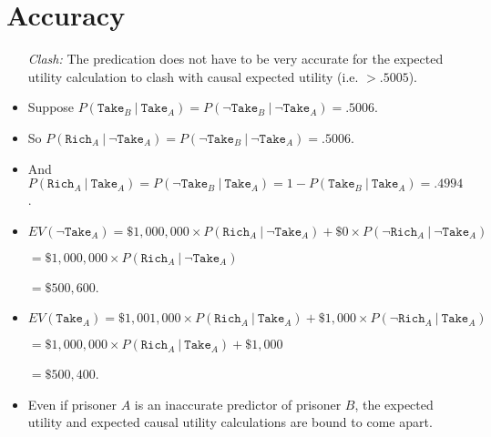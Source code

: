 \documentclass[a4paper, 11pt]{article} %
\begin{document}
\section*{Accuracy}

\begin{itemize}
  \item[\it Clash:] The predication does not have to be very accurate for the expected utility calculation to clash with causal expected utility (i.e. $> .5005$).
    \item Suppose $P(\texttt{Take}_B\ |\ \texttt{Take}_A) = P(\neg \texttt{Take}_B\ |\ \neg \texttt{Take}_A) = .5006$.
    \item So $P(\texttt{Rich}_A\ |\ \neg \texttt{Take}_A) = P(\neg \texttt{Take}_B\ |\ \neg \texttt{Take}_A) = .5006$.
    \item \mbox{And $P(\texttt{Rich}_A\ |\ \texttt{Take}_A) = P(\neg \texttt{Take}_B\ |\ \texttt{Take}_A) = 1 - P(\texttt{Take}_B\ |\ \texttt{Take}_A) = .4994$.}
    \item $EV(\neg \texttt{Take}_A) = \$1,000,000\times P(\texttt{Rich}_A\ |\ \neg\texttt{Take}_A) + \$0\times P(\neg \texttt{Rich}_A\ |\ \neg \texttt{Take}_A)$
    \item[] \hspace{.88in} $= \$1,000,000\times P(\texttt{Rich}_A\ |\ \neg\texttt{Take}_A)$
    \item[] \hspace{.88in} $= \$500,600$.
    \item $EV(\texttt{Take}_A) = \$1,001,000\times P(\texttt{Rich}_A\ |\ \texttt{Take}_A) + \$1,000\times P(\neg \texttt{Rich}_A\ |\ \texttt{Take}_A)$
    \item[] \hspace{.76in} $= \$1,000,000\times P(\texttt{Rich}_A\ |\ \texttt{Take}_A) + \$1,000$
    \item[] \hspace{.76in} $= \$500,400$.
    \item Even if prisoner $A$ is an inaccurate predictor of prisoner $B$, the expected utility and expected causal utility calculations are bound to come apart.
\end{itemize}
\end{document}
